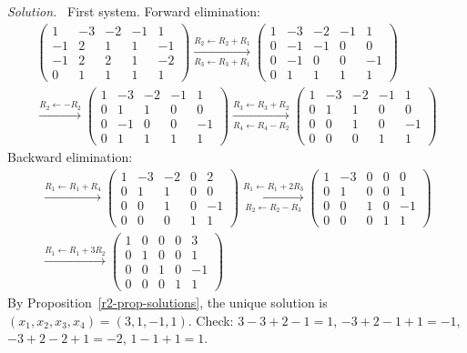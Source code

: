 \documentclass[12pt]{article}
\theoremstyle{definition}
\newenvironment{solution}{\par\noindent\textit{Solution.}\ }{\par\smallskip}
\begin{document}
\begin{solution}
First system. Forward elimination:
\[
\begin{gathered}
\left(\begin{array}{cccc|c}1&-3&-2&-1&1\\-1&2&1&1&-1\\-1&2&2&1&-2\\0&1&1&1&1\end{array}\right)
\xrightarrow[R_3\leftarrow R_3+R_1]{R_2\leftarrow R_2+R_1}
\left(\begin{array}{cccc|c}1&-3&-2&-1&1\\0&-1&-1&0&0\\0&-1&0&0&-1\\0&1&1&1&1\end{array}\right)
\\
\xrightarrow{R_2\leftarrow-R_2}
\left(\begin{array}{cccc|c}1&-3&-2&-1&1\\0&1&1&0&0\\0&-1&0&0&-1\\0&1&1&1&1\end{array}\right)
\xrightarrow[R_4\leftarrow R_4-R_2]{R_3\leftarrow R_3+R_2}
\left(\begin{array}{cccc|c}1&-3&-2&-1&1\\0&1&1&0&0\\0&0&1&0&-1\\0&0&0&1&1\end{array}\right)
\end{gathered}
\]
Backward elimination:
\[
\begin{gathered}
\xrightarrow{R_1\leftarrow R_1+R_4}
\left(\begin{array}{cccc|c}1&-3&-2&0&2\\0&1&1&0&0\\0&0&1&0&-1\\0&0&0&1&1\end{array}\right)
\xrightarrow[R_2\leftarrow R_2-R_3]{R_1\leftarrow R_1+2R_3}
\left(\begin{array}{cccc|c}1&-3&0&0&0\\0&1&0&0&1\\0&0&1&0&-1\\0&0&0&1&1\end{array}\right)
\\
\xrightarrow{R_1\leftarrow R_1+3R_2}
\left(\begin{array}{cccc|c}1&0&0&0&3\\0&1&0&0&1\\0&0&1&0&-1\\0&0&0&1&1\end{array}\right)
\end{gathered}
\]
By Proposition~\ref{r2-prop-solutions}, the unique solution is \((x_1,x_2,x_3,x_4)=(3,1,-1,1)\).
Check: \(3-3+2-1=1\), \(-3+2-1+1=-1\), \(-3+2-2+1=-2\), \(1-1+1=1\).


\end{solution}
\end{document}
